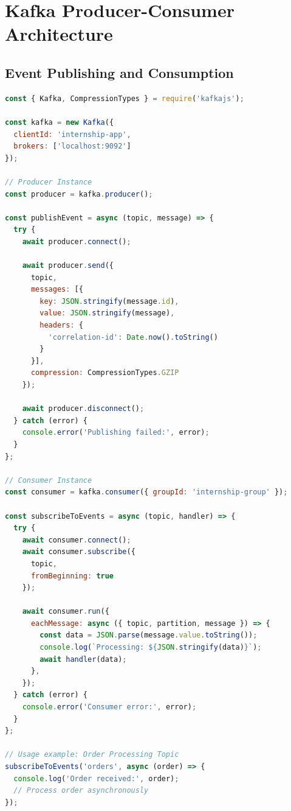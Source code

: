 \section{Kafka Producer-Consumer Architecture}

\subsection{Event Publishing and Consumption}

\begin{lstlisting}[language=JavaScript, caption=Kafka Message Handling]
const { Kafka, CompressionTypes } = require('kafkajs');

const kafka = new Kafka({
  clientId: 'internship-app',
  brokers: ['localhost:9092']
});

// Producer Instance
const producer = kafka.producer();

const publishEvent = async (topic, message) => {
  try {
    await producer.connect();
    
    await producer.send({
      topic,
      messages: [{
        key: JSON.stringify(message.id),
        value: JSON.stringify(message),
        headers: {
          'correlation-id': Date.now().toString()
        }
      }],
      compression: CompressionTypes.GZIP
    });
    
    await producer.disconnect();
  } catch (error) {
    console.error('Publishing failed:', error);
  }
};

// Consumer Instance
const consumer = kafka.consumer({ groupId: 'internship-group' });

const subscribeToEvents = async (topic, handler) => {
  try {
    await consumer.connect();
    await consumer.subscribe({ 
      topic, 
      fromBeginning: true 
    });

    await consumer.run({
      eachMessage: async ({ topic, partition, message }) => {
        const data = JSON.parse(message.value.toString());
        console.log(`Processing: ${JSON.stringify(data)}`);
        await handler(data);
      },
    });
  } catch (error) {
    console.error('Consumer error:', error);
  }
};

// Usage example: Order Processing Topic
subscribeToEvents('orders', async (order) => {
  console.log('Order received:', order);
  // Process order asynchronously
});
\end{lstlisting}

\newpage
